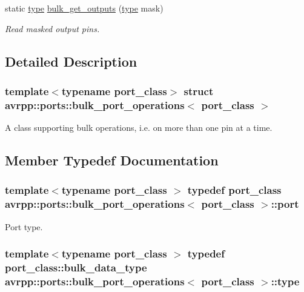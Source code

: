\begin{DoxyCompactItemize}
static \hyperlink{structavrpp_1_1ports_1_1bulk__port__operations_a2a673fecf314e62c4c7a88fc63911ebb}{type} \hyperlink{structavrpp_1_1ports_1_1bulk__port__operations_a16e1656be7d2171aaa84d956624b6697}{bulk\_\-get\_\-outputs} (\hyperlink{structavrpp_1_1ports_1_1bulk__port__operations_a2a673fecf314e62c4c7a88fc63911ebb}{type} mask)
\begin{DoxyCompactList}\small\item\em Read masked output pins. \item\end{DoxyCompactList}\end{DoxyCompactItemize}


\subsection{Detailed Description}
\subsubsection*{template$<$typename port\_\-class$>$ struct avrpp::ports::bulk\_\-port\_\-operations$<$ port\_\-class $>$}

A class supporting bulk operations, i.e. on more than one pin at a time. 

\subsection{Member Typedef Documentation}
\hypertarget{structavrpp_1_1ports_1_1bulk__port__operations_a40b1eac998801ad35ea64ab07a1a4785}{
\subsubsection[{port}]{\setlength{\rightskip}{0pt plus 5cm}template$<$typename port\_\-class $>$ typedef port\_\-class {\bf avrpp::ports::bulk\_\-port\_\-operations}$<$ port\_\-class $>$::{\bf port}}}
\label{structavrpp_1_1ports_1_1bulk__port__operations_a40b1eac998801ad35ea64ab07a1a4785}


Port type. 

\hypertarget{structavrpp_1_1ports_1_1bulk__port__operations_a2a673fecf314e62c4c7a88fc63911ebb}{
\subsubsection[{type}]{\setlength{\rightskip}{0pt plus 5cm}template$<$typename port\_\-class $>$ typedef port\_\-class::bulk\_\-data\_\-type {\bf avrpp::ports::bulk\_\-port\_\-operations}$<$ port\_\-class $>$::{\bf type}}}
\label{structavrpp_1_1ports_1_1bulk__port__operations_a2a673fecf314e62c4c7a88fc63911ebb}


